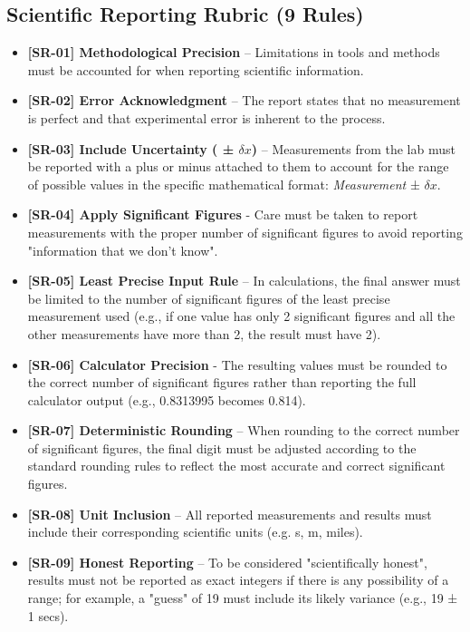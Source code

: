 \documentclass{article}
\begin{document}
\subsection*{Scientific Reporting Rubric (9 Rules)}
\begin{itemize}
\item \textbf{ [SR-01] Methodological Precision } – Limitations in tools and methods must be accounted for when reporting scientific information.
\item \textbf{ [SR-02] Error Acknowledgment } – The report states that no measurement is perfect and that experimental error is inherent to the process.
\item \textbf{ [SR-03] Include Uncertainty ( ± $ \delta x $) } – Measurements from the lab must be reported with a plus or minus attached to them to account for the range of possible values in the specific mathematical format: \textit{Measurement} ± $ \delta x $.
\item \textbf{ [SR-04] Apply Significant Figures } - Care must be taken to report measurements with the proper number of significant figures to avoid reporting "information that we don't know".
\item \textbf{ [SR-05] Least Precise Input Rule } – In calculations, the final answer must be limited to the number of significant figures of the least precise measurement used (e.g., if one value has only 2 significant figures and all the other measurements have more than 2, the result must have 2).
\item \textbf{ [SR-06] Calculator Precision } - The resulting values must be rounded to the correct number of significant figures rather than reporting the full calculator output (e.g., 0.8313995 becomes 0.814). 
\item \textbf{ [SR-07] Deterministic Rounding } – When rounding to the correct number of significant figures, the final digit must be adjusted according to the standard rounding rules to reflect the most accurate and correct significant figures.
\item \textbf{ [SR-08] Unit Inclusion } – All reported measurements and results must include their corresponding scientific units (e.g. s, m, miles).
\item \textbf{ [SR-09] Honest Reporting } – To be considered "scientifically honest", results must not be reported as exact integers if there is any possibility of a range; for example, a "guess" of 19 must include its likely variance (e.g., 19 ± 1 secs).
\end{itemize}
\end{document}
